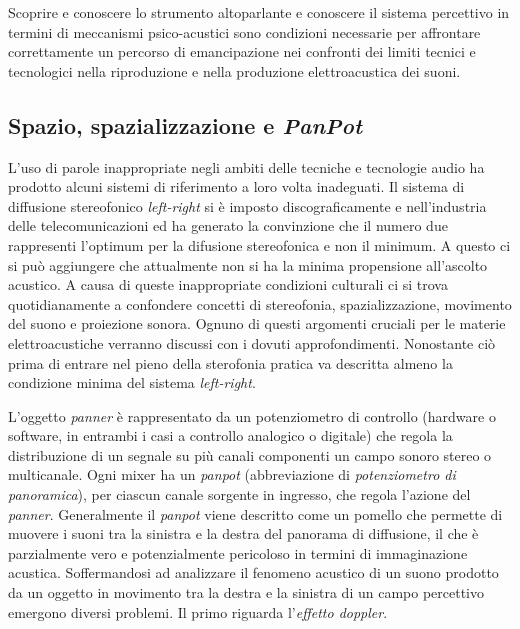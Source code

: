 Scoprire e conoscere lo strumento altoparlante e conoscere il sistema percettivo
in termini di meccanismi psico-acustici sono condizioni necessarie per
affrontare correttamente un percorso di emancipazione nei confronti dei limiti
tecnici e tecnologici nella riproduzione e nella produzione elettroacustica dei suoni.

\subsection{Spazio, spazializzazione e \emph{PanPot}}
\label{sec:panpot}

L'uso di parole inappropriate negli ambiti delle tecniche e tecnologie audio ha prodotto
alcuni sistemi di riferimento a loro volta inadeguati. Il sistema di diffusione
stereofonico \emph{left-right} si è imposto discograficamente e nell'industria
delle telecomunicazioni ed ha generato la convinzione che il numero due
rappresenti l'optimum per la difusione stereofonica e non il minimum.
A questo ci si può aggiungere che attualmente non si ha la minima propensione
all'ascolto acustico. A causa di queste inappropriate condizioni culturali
ci si trova quotidianamente a confondere concetti di stereofonia,
spazializzazione, movimento del suono e proiezione sonora. Ognuno di questi
argomenti cruciali per le materie elettroacustiche verranno discussi con i
dovuti approfondimenti. Nonostante ciò prima di entrare nel pieno della sterofonia
pratica va descritta almeno la condizione minima del sistema \emph{left-right}.

L'oggetto \emph{panner} è rappresentato da un potenziometro di controllo
(hardware o software, in entrambi i casi a controllo analogico o digitale) che
regola la distribuzione di un segnale su più canali componenti un campo sonoro
stereo o multicanale. Ogni mixer ha un \emph{panpot} (abbreviazione di
\emph{potenziometro di panoramica}), per ciascun canale sorgente in ingresso,
che regola l'azione del \emph{panner}. Generalmente il \emph{panpot} viene descritto come un pomello che permette di
muovere i suoni tra la sinistra e la destra del panorama di diffusione, il che è
parzialmente vero e potenzialmente pericoloso in termini di immaginazione
acustica. Soffermandosi ad analizzare il fenomeno acustico di un suono prodotto da un
oggetto in movimento tra la destra e la sinistra di un campo percettivo emergono
diversi problemi. Il primo riguarda l'\emph{effetto doppler}.

